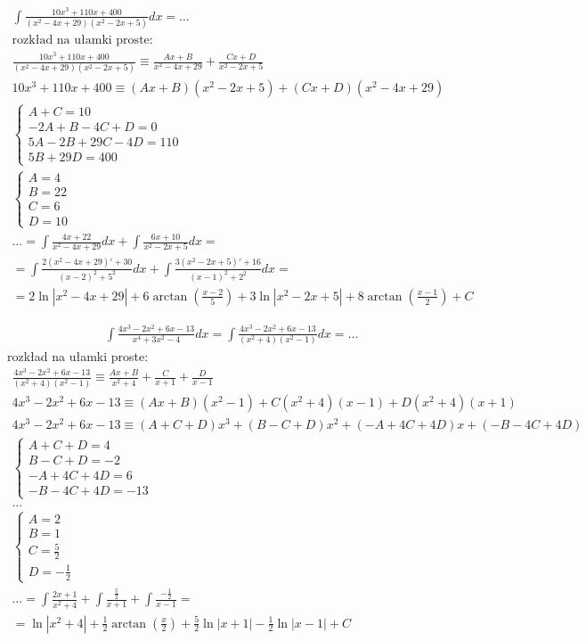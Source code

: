 
\begin{gather*}
  \int \frac{10x^3+110x+400}{(x^2-4x+29)(x^2-2x+5)}dx = \ldots \\
  \text{rozkład na ułamki proste:} \\
  \frac{10x^3+110x+400}{(x^2-4x+29)(x^2-2x+5)} \equiv \frac{Ax+B}{x^2-4x+29}+\frac{Cx+D}{x^2-2x+5} \\
  10x^3+110x+400 \equiv (Ax+B)(x^2-2x+5)+(Cx+D)(x^2-4x+29) \\
  \begin{cases} A+C=10 \\ -2A+B-4C+D=0 \\ 5A-2B+29C-4D=110 \\ 5B+29D=400 \end{cases} \\
  \begin{cases} A=4 \\ B=22 \\ C=6 \\ D=10 \end{cases} \\
  \ldots = \int \frac{4x+22}{x^2-4x+29}dx + \int \frac{6x+10}{x^2-2x+5}dx = \\
  = \int \frac{2(x^2-4x+29)'+30}{(x-2)^2+5^2}dx + \int \frac{3(x^2-2x+5)'+16}{(x-1)^2+2^2}dx = \\
  = 2\ln|x^2-4x+29|+6\arctan \left(\frac{x-2}{5}\right)+3\ln|x^2-2x+5|+8\arctan\left(\frac{x-1}{2}\right)+C
\end{gather*}



\begin{gather*}\int \frac{4x^3-2x^2+6x-13}{x^4+3x^2-4}dx = \int \frac{4x^3-2x^2+6x-13}{(x^2+4)(x^2-1)}dx=\ldots\end{gather*}
rozkład na ułamki proste:
\begin{gather*}\frac{4x^3-2x^2+6x-13}{(x^2+4)(x^2-1)} \equiv \frac{Ax+B}{x^2+4}+\frac{C}{x+1}+\frac{D}{x-1} \\
4x^3-2x^2+6x-13 \equiv (Ax+B)(x^2-1)+C(x^2+4)(x-1)+D(x^2+4)(x+1) \\
4x^3-2x^2+6x-13 \equiv (A+C+D)x^3+(B-C+D)x^2+(-A+4C+4D)x+(-B-4C+4D) \\
\begin{cases} A+C+D=4 \\ B-C+D=-2 \\ -A+4C+4D=6 \\ -B-4C+4D=-13 \end{cases} \\
\ldots \\
\begin{cases} A=2 \\ B=1 \\ C=\frac{5}{2} \\ D=-\frac{1}{2} \end{cases} \\
\ldots = \int \frac{2x+1}{x^2+4}+ \int \frac{\frac{5}{2}}{x+1}+ \int \frac{-\frac{1}{2}}{x-1} = \\
= \ln|x^2+4|+\frac{1}{2}\arctan \left(\frac{x}{2}\right) +\frac{5}{2}\ln|x+1|-\frac{1}{2}\ln|x-1|+C\end{gather*}


